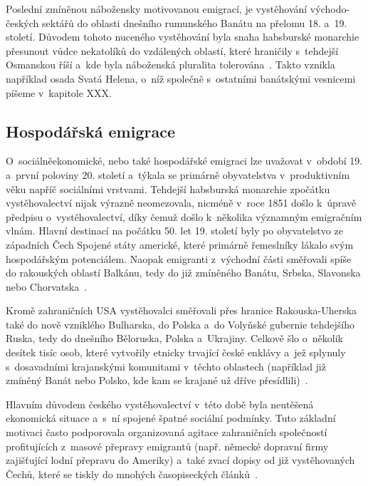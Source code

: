 Poslední zmíněnou nábožensky motivovanou emigrací, je vystěhování východo-českých sektářů do oblasti dnešního rumunského Banátu na přelomu 18. a~19. století. Důvodem tohoto nuceného vystěhování byla snaha habsburské monarchie přesunout vůdce nekatolíků do vzdálených oblastí, které hraničily s~tehdejší Osmanskou říší a~kde byla náboženská pluralita tolerována~\parencite{Nespor2005}. Takto vznikla například osada Svatá Helena, o~níž společně s~ostatními banátskými vesnicemi píšeme v~kapitole XXX.

\hypertarget{hospoduxe1ux159skuxe1-emigrace}{%
\subsection{Hospodářská emigrace}\label{hospoduxe1ux159skuxe1-emigrace}}

O~sociálněekonomické, nebo také hospodářské emigraci lze uvažovat v~období 19. a~první poloviny 20. století a~týkala se primárně obyvatelstva v~produktivním věku napříč sociálními vrstvami. Tehdejší habsburská monarchie zpočátku vystěhovalectví nijak výrazně neomezovala, nicméně v~roce 1851 došlo k~úpravě předpisu o~vystěhovalectví, díky čemuž došlo k~několika významným emigračním vlnám. Hlavní destinací na počátku 50. let 19. století byly po obyvatelstvo ze západních Čech Spojené státy americké, které primárně řemeslníky lákalo svým hospodářským potenciálem. Naopak emigranti z~východní části směřovali spíše do rakouských oblastí Balkánu, tedy do již zmíněného Banátu, Srbska, Slavonska nebo Chorvatska~\parencite{Vaculik2009b}.

Kromě zahraničních USA vystěhovalci směřovali přes hranice Rakouska-Uherska také do nově vzniklého Bulharska, do Polska a~do Volyňské gubernie tehdejšího Ruska, tedy do dnešního Běloruska, Polska a~Ukrajiny. Celkově šlo o~několik desítek tisíc osob, které vytvořily etnicky trvající české enklávy a~jež splynuly s~dosavadními krajanskými komunitami v~těchto oblastech (například již zmíněný Banát nebo Polsko, kde kam se krajané už dříve přesídlili)~\parencite{Nespor2005}.

Hlavním důvodem českého vystěhovalectví v~této době byla neutěšená ekonomická situace a~s~ní spojené špatné sociální podmínky. Tuto základní motivaci často podporovala organizovaná agitace zahraničních společností profitujících z~masové přepravy emigrantů (např. německé dopravní firmy zajišťující lodní přepravu do Ameriky) a~také zvací dopisy od již vystěhovaných Čechů, které se tiskly do mnohých časopiseckých článků~\parencite{Vaculik2009a}.

